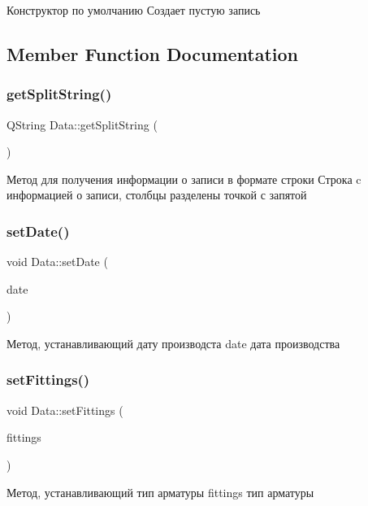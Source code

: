 Конструктор по умолчанию Создает пустую запись 

\subsection{Member Function Documentation}
\mbox{\label{class_data_a1335dbd643f8324782c0a219b6acb0d5}} 
\subsubsection{\texorpdfstring{getSplitString()}{getSplitString()}}
{\footnotesize\ttfamily Q\+String Data\+::get\+Split\+String (\begin{DoxyParamCaption}{ }\end{DoxyParamCaption})}

Метод для получения информации о записи в формате строки Строка c информацией о записи, столбцы разделены точкой с запятой \mbox{\label{class_data_a8b89370bb424c114f707ae6d6a7ae807}} 
\subsubsection{\texorpdfstring{setDate()}{setDate()}}
{\footnotesize\ttfamily void Data\+::set\+Date (\begin{DoxyParamCaption}\item[{const Q\+String \&}]{date }\end{DoxyParamCaption})}

Метод, устанавливающий дату производста date дата производства \mbox{\label{class_data_a091525ef3fbe398be05227836db730eb}} 
\subsubsection{\texorpdfstring{setFittings()}{setFittings()}}
{\footnotesize\ttfamily void Data\+::set\+Fittings (\begin{DoxyParamCaption}\item[{const Q\+String \&}]{fittings }\end{DoxyParamCaption})}

Метод, устанавливающий тип арматуры fittings тип арматуры \mbox{\label{class_data_a9ae14fe40ea3487fd8a1571a592b8946}} 
